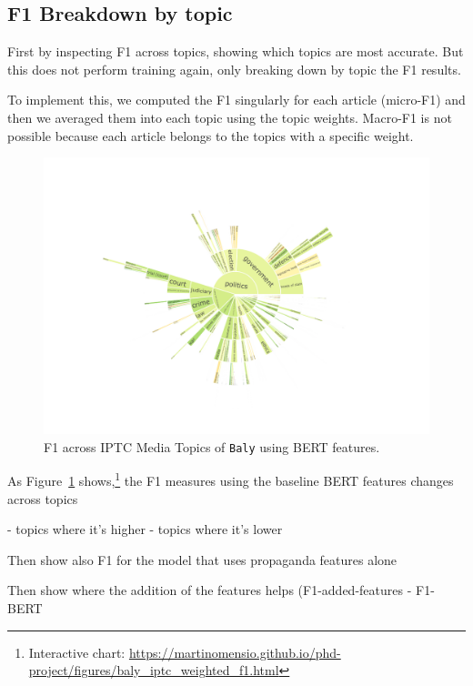 \subsection{F1 Breakdown by topic}
\label{sec:topic_classifier_propaganda_f1_across}

First by inspecting F1 across topics, showing which topics are most accurate.
But this does not perform training again, only breaking down by topic the F1 results.

To implement this, we computed the F1 singularly for each article (micro-F1) and then we averaged them into each topic using the topic weights. Macro-F1 is not possible because each article belongs to the topics with a specific weight.

\begin{figure}[!htbp]
    \centering
    \includegraphics[trim={2.2cm 2cm 2.2cm 2cm},clip,width=\linewidth]{figures/baly_iptc_weighted_f1.pdf}
    \caption{F1 across IPTC Media Topics of \texttt{Baly} using BERT features.}
    \label{fig:baly_iptc_weighted_f1}
\end{figure}

As Figure~\ref{fig:baly_iptc_weighted_f1} shows,\footnote{Interactive chart: \url{https://martinomensio.github.io/phd-project/figures/baly_iptc_weighted_f1.html}} the F1 measures using the baseline BERT features changes across topics

- topics where it's higher
- topics where it's lower

Then show also F1 for the model that uses propaganda features alone

Then show where the addition of the features helps (F1-added-features - F1-BERT



